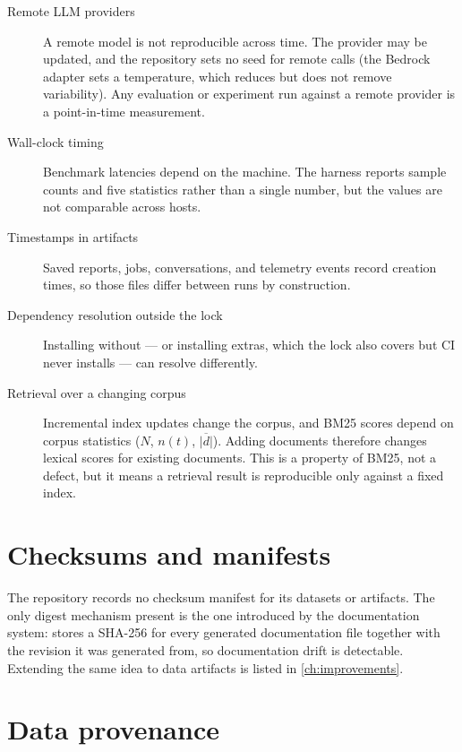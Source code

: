 \begin{description}
  \item[Remote LLM providers] A remote model is not reproducible across time.
    The provider may be updated, and the repository sets no seed for remote
    calls (the Bedrock adapter sets a temperature, which reduces but does not
    remove variability). Any evaluation or experiment run against a remote
    provider is a point-in-time measurement.
  \item[Wall-clock timing] Benchmark latencies depend on the machine. The
    harness reports sample counts and five statistics rather than a single
    number, but the values are not comparable across hosts.
  \item[Timestamps in artifacts] Saved reports, jobs, conversations, and
    telemetry events record creation times, so those files differ between runs
    by construction.
  \item[Dependency resolution outside the lock] Installing without
     --- or installing extras, which the lock also covers
    but CI never installs --- can resolve differently.
  \item[Retrieval over a changing corpus] Incremental index updates change the
    corpus, and BM25 scores depend on corpus statistics
    ($N$, $n(t)$, $\overline{|d|}$). Adding documents therefore changes lexical
    scores for existing documents. This is a property of BM25, not a defect,
    but it means a retrieval result is reproducible only against a fixed index.
\end{description}

\section{Checksums and manifests}

The repository records no checksum manifest for its datasets or artifacts. The
only digest mechanism present is the one introduced by the documentation
system:  stores a SHA-256
for every generated documentation file together with the revision it was
generated from, so documentation drift is detectable. Extending the same idea to
data artifacts is listed in \cref{ch:improvements}.

\section{Data provenance}


